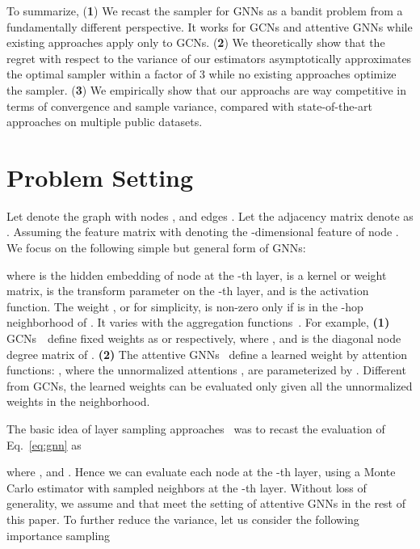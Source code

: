\documentclass{article}
\begin{document}
To summarize,
(\textbf{1}) We recast the sampler for GNNs as a bandit 
problem from a fundamentally different perspective. It works
for GCNs and attentive GNNs while existing approaches apply
only to GCNs.
(\textbf{2}) We theoretically show that the regret with 
respect to the variance of our estimators asymptotically 
approximates the optimal sampler within a factor of 3 while
no existing approaches optimize the sampler. 
(\textbf{3}) We empirically show that our approachs are way competitive in
terms of convergence and sample variance, compared with 
state-of-the-art approaches on multiple public datasets.

\section{Problem Setting}

Let  denote the graph with 
 nodes , and edges 
. Let the adjacency matrix 
denote as . 
Assuming the feature matrix  
with  denoting the -dimensional feature 
of node . We focus on the following simple 
but general form of GNNs:

where  is the hidden embedding of node  at the -th layer,
 is a kernel or weight matrix,  
 is the 
transform parameter on the -th layer, and  
is the activation function. The weight 
, or  for simplicity, 
is non-zero only if  is in the -hop 
neighborhood  of . It varies with 
the aggregation 
functions~\cite{battaglia2018relational,wu2019comprehensive}. 
For example, 
\textbf{(1)} GCNs~\cite{dai2016discriminative,kipf2016semi}~define fixed weights as  or  respectively, where , and  is the diagonal node degree matrix of .
    \textbf{(2)} The attentive GNNs~\cite{velivckovic2017graph,liu2019geniepath} define a learned weight  by attention functions:
, where the unnormalized
attentions
    ,
are parameterized by . Different from GCNs, the learned weights  can be evaluated only given all the unnormalized weights in the neighborhood.


The basic idea of layer sampling 
approaches~\cite{hamilton2017inductive,chen2018fastgcn,huang2018adaptive,zou2019layer}
was to recast the evaluation of Eq.~\eqref{eq:gnn} as

where , and 
. Hence
we can evaluate each node  at the -th layer,
using a Monte Carlo
estimator with sampled neighbors at the -th layer.
Without loss of generality, we assume 
and 
that meet the setting of attentive GNNs
in the rest of this paper.
To further reduce the variance, let us
consider the following importance sampling
\end{document}
